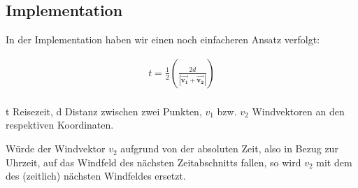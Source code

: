\subsection{Implementation}
In der Implementation haben wir einen noch einfacheren Ansatz verfolgt:

\begin{align}
t = \frac{1}{2} (\frac{2d}{|\mathbf{\overrightarrow{v_{1}}} + \mathbf{\overrightarrow{v_{2}}}|}) \\
\end{align}

t Reisezeit, d Distanz zwischen zwei Punkten, $v_{1}$ bzw. $v_{2}$
Windvektoren an den respektiven Koordinaten.

Würde der Windvektor $v_{2}$ aufgrund von der absoluten Zeit, also in
Bezug zur Uhrzeit, auf das Windfeld des nächsten Zeitabschnitts fallen,
so wird $v_{2}$ mit dem des (zeitlich) nächsten Windfeldes ersetzt.
